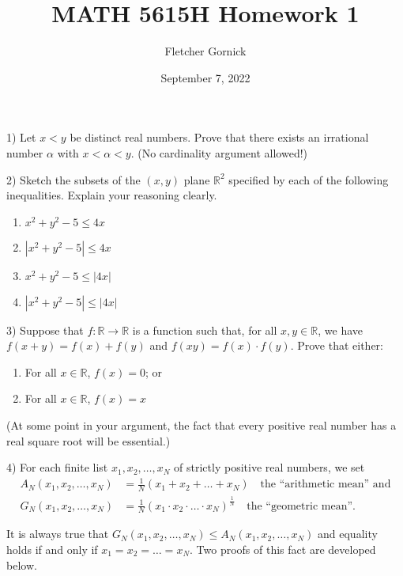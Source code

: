 \documentclass[11pt]{article}
\title{\vspace{-1.0cm}MATH 5615H Homework 1}
\author{Fletcher Gornick}
\date{September 7, 2022}
\begin{document}
 \maketitle

 1) Let \(x < y\) be distinct real numbers.  Prove that there exists an irrational number \(\alpha\) with
 \(x < \alpha < y\).  (No cardinality argument allowed!)
 \newpage

 2) Sketch the subsets of the \((x,y)\) plane \(\mathbb{R}^2\) specified by each of the following inequalities.
 Explain your reasoning clearly.

 \begin{enumerate}[label=(\roman*)]
   \item \(x^2 + y^2 - 5 \leq 4x\)
   \item \(|x^2 + y^2 - 5| \leq 4x\)
   \item \(x^2 + y^2 - 5 \leq |4x|\)
   \item \(|x^2 + y^2 - 5| \leq |4x|\)
 \end{enumerate}
 \newpage

 3) Suppose that \(f : \mathbb{R} \rightarrow \mathbb{R}\) is a function such that, for all \(x,y \in \mathbb{R}\),
 we have \(f(x+y) = f(x) + f(y)\) and \(f(xy) = f(x) \cdot f(y)\).  Prove that either:

 \begin{enumerate}[label=(\roman*)]
   \item For all \(x \in \mathbb{R}\), \(f(x) = 0\); or
   \item For all \(x \in \mathbb{R}\), \(f(x) = x\)
 \end{enumerate}
 (At some point in your argument, the fact that every positive real number has a real square root will be essential.)
 \newpage

 4) For each finite list \(x_1, x_2, \dots, x_N\) of strictly positive real numbers, we set 
 \begin{align*}
   A_N (x_1, x_2, \dots, x_N) &= \frac{1}{N}(x_1 + x_2 + \dots + x_N) \quad \text{the ``arithmetic mean'' and} \\
   G_N (x_1, x_2, \dots, x_N) &= \frac{1}{N}(x_1 \cdot x_2 \cdot \ldots \cdot x_N)^\frac{1}{N} \quad
   \text{the ``geometric mean''.}
 \end{align*}

 It is always true that \(G_N (x_1, x_2, \dots, x_N) \leq A_N (x_1, x_2, \dots, x_N)\) and equality holds if and only 
 if \(x_1 = x_2 = \ldots = x_N\).  Two proofs of this fact are developed below.
\end{document}
